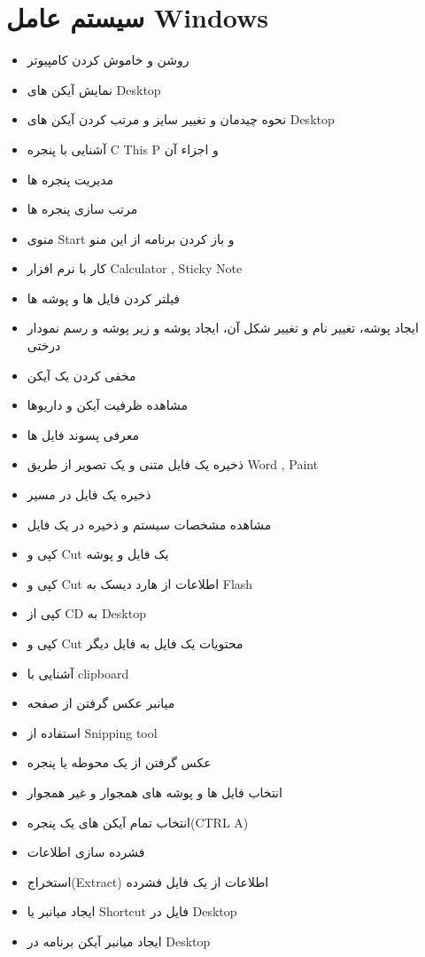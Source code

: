 \section{سیستم عامل Windows}
\begin{itemize}
\item
روشن و خاموش کردن کامپیوتر
\item
نمایش آیکن های Desktop
\item
نحوه چیدمان و تغییر سایز و مرتب کردن آیکن های Desktop
\item
آشنایی با پنجره C This P و اجزاء آن
\item
مدیریت پنجره ها
\item
مرتب سازی پنجره ها
\item
منوی Start و باز کردن برنامه از این منو
\item
کار با نرم افزار Calculator , Sticky Note
\item
فیلتر کردن فایل ها و پوشه ها
\item
ایجاد پوشه، تغییر نام و تغییر شکل آن، ایجاد پوشه و زیر پوشه و رسم نمودار درختی
\item
مخفی کردن یک آیکن
\item
مشاهده ظرفیت آیکن و داریوها
\item
معرفی پسوند فایل ها
\item
ذخیره یک فایل متنی و یک تصویر از طریق Word , Paint
\item
ذخیره یک فایل در مسیر
\item
مشاهده مشخصات سیستم و ذخیره در یک فایل
\item
کپی و Cut یک فایل و پوشه
\item
کپی و Cut اطلاعات از هارد دیسک به Flash
\item
کپی از CD به Desktop
\item
کپی و Cut محتویات یک فایل به فایل دیگر
\item
آشنایی با clipboard
\item
میانبر عکس گرفتن از صفحه
\item
استفاده از Snipping tool
\item
عکس گرفتن از یک محوطه یا پنجره
\item
انتخاب فایل ها و پوشه های همجوار و غیر همجوار
\item
انتخاب تمام آیکن های یک پنجره(CTRL A)
\item
فشرده سازی اطلاعات
\item
استخراج(Extract) اطلاعات از یک فایل فشرده
\item
ایجاد میانبر یا Shortcut فایل در Desktop
\item
ایجاد میانبر آیکن برنامه در Desktop

\end{itemize}
